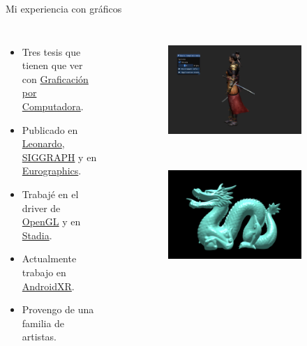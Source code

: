 \begin{frame}{Mi experiencia con gráficos}
\begin{columns}
    \begin{itemize}
         \item Tres tesis que tienen que ver con \href{https://en.wikipedia.org/wiki/Computer_graphics}{Graficación por Computadora}.
         \item Publicado en \href{https://direct.mit.edu/leon}{Leonardo}, \href{https://www.siggraph.org/}{SIGGRAPH} y en \href{https://www.eg.org/wp/eurographics-publications/}{Eurographics}.
         \item Trabajé en el driver de \href{https://www.opengl.org/}{OpenGL} y en \href{https://stadia.google.com/gg/}{Stadia}.
         \item Actualmente trabajo en \href{https://www.android.com/xr/}{AndroidXR}.
         \item Provengo de una familia de artistas.
     \end{itemize}
\begin{figure}[htp]
 \centering
 \begin{subfigure}[b]{0.4\textwidth}
   \includegraphics[width=\textwidth]{img/menuTemplate}
 \end{subfigure}
~
 \begin{subfigure}[b]{0.4\textwidth}
   \includegraphics[width=\textwidth]{img/completo}

\end{subfigure}
\end{figure}
\end{columns}
\end{frame}
